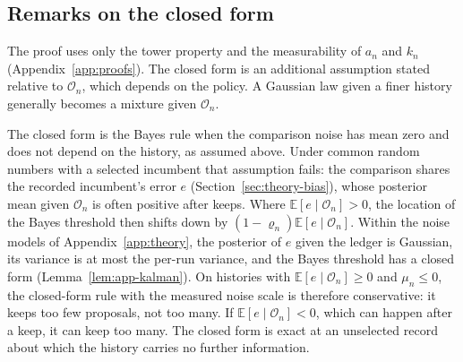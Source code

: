 \subsection{Remarks on the closed form}

The proof uses only the tower property and the measurability of $a_n$ and $k_n$ (Appendix~\ref{app:proofs}). The closed form is an additional assumption stated relative to $\mathcal{O}_n$, which depends on the policy. A Gaussian law given a finer history generally becomes a mixture given $\mathcal{O}_n$.

The closed form is the Bayes rule when the comparison noise has mean zero and does not depend on the history, as assumed above. Under common random numbers with a selected incumbent that assumption fails: the comparison shares the recorded incumbent's error $e$ (Section~\ref{sec:theory-bias}), whose posterior mean given $\mathcal{O}_n$ is often positive after keeps. Where $\mathbb{E}[e\mid\mathcal{O}_n]>0$, the location of the Bayes threshold then shifts down by $(1-\varrho_n)\mathbb{E}[e\mid\mathcal{O}_n]$. %
Within the noise models of Appendix~\ref{app:theory}, the posterior of $e$ given the ledger is Gaussian, its variance is at most the per-run variance, and the Bayes threshold has a closed form (Lemma~\ref{lem:app-kalman}). On histories with $\mathbb{E}[e\mid\mathcal{O}_n]\ge0$ and $\mu_n\le0$, the closed-form rule with the measured noise scale is therefore conservative: it keeps too few proposals, not too many. If $\mathbb{E}[e\mid\mathcal{O}_n]<0$, which can happen after a keep, it can keep too many. The closed form is exact at an unselected record about which the history carries no further information.

